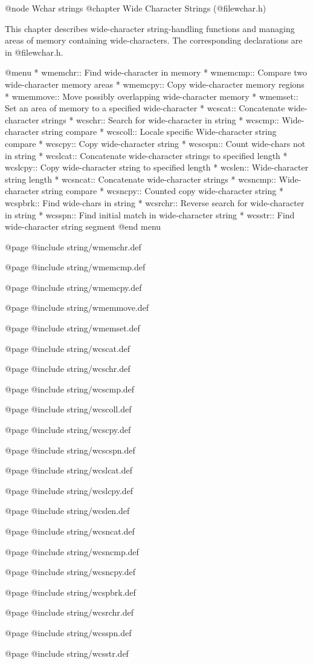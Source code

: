 @node Wchar strings
@chapter Wide Character Strings (@file{wchar.h})

This chapter describes wide-character string-handling functions and
managing areas of memory containing wide-characters.  The corresponding 
declarations are in @file{wchar.h}.

@menu
* wmemchr::     Find wide-character in memory
* wmemcmp::     Compare two wide-character memory areas
* wmemcpy::     Copy wide-character memory regions
* wmemmove::    Move possibly overlapping wide-character memory
* wmemset::     Set an area of memory to a specified wide-character
* wcscat::      Concatenate wide-character strings
* wcschr::      Search for wide-character in string
* wcscmp::      Wide-character string compare
* wcscoll::     Locale specific Wide-character string compare
* wcscpy::      Copy wide-character string
* wcscspn::     Count wide-chars not in string
* wcslcat::     Concatenate wide-character strings to specified length
* wcslcpy::     Copy wide-character string to specified length
* wcslen::      Wide-character string length
* wcsncat::     Concatenate wide-character strings
* wcsncmp::     Wide-character string compare
* wcsncpy::     Counted copy wide-character string
* wcspbrk::     Find wide-chars in string
* wcsrchr::     Reverse search for wide-character in string
* wcsspn::      Find initial match in wide-character string
* wcsstr::      Find wide-character string segment
@end menu

@page
@include string/wmemchr.def

@page
@include string/wmemcmp.def

@page
@include string/wmemcpy.def

@page
@include string/wmemmove.def

@page
@include string/wmemset.def

@page
@include string/wcscat.def

@page
@include string/wcschr.def

@page
@include string/wcscmp.def

@page
@include string/wcscoll.def

@page
@include string/wcscpy.def

@page
@include string/wcscspn.def

@page
@include string/wcslcat.def

@page
@include string/wcslcpy.def

@page
@include string/wcslen.def

@page
@include string/wcsncat.def

@page
@include string/wcsncmp.def

@page
@include string/wcsncpy.def

@page
@include string/wcspbrk.def

@page
@include string/wcsrchr.def

@page
@include string/wcsspn.def

@page
@include string/wcsstr.def

